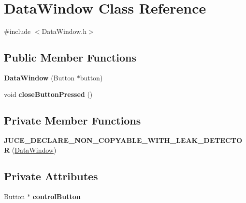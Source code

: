 \hypertarget{classDataWindow}{\section{Data\-Window Class Reference}
\label{classDataWindow}
}


{\ttfamily \#include $<$Data\-Window.\-h$>$}

\subsection*{Public Member Functions}
\begin{DoxyCompactItemize}
\item 
\hypertarget{classDataWindow_a2c1a0313c6a13ebf16c40db1a5832cca}{{\bfseries Data\-Window} (Button $\ast$button)}\label{classDataWindow_a2c1a0313c6a13ebf16c40db1a5832cca}

\item 
\hypertarget{classDataWindow_ad3e0318d8e542aa12b30791441cae5ab}{void {\bfseries close\-Button\-Pressed} ()}\label{classDataWindow_ad3e0318d8e542aa12b30791441cae5ab}

\end{DoxyCompactItemize}
\subsection*{Private Member Functions}
\begin{DoxyCompactItemize}
\item 
\hypertarget{classDataWindow_a4e4c8bb6b88c32202f4ee263aef5cbf5}{{\bfseries J\-U\-C\-E\-\_\-\-D\-E\-C\-L\-A\-R\-E\-\_\-\-N\-O\-N\-\_\-\-C\-O\-P\-Y\-A\-B\-L\-E\-\_\-\-W\-I\-T\-H\-\_\-\-L\-E\-A\-K\-\_\-\-D\-E\-T\-E\-C\-T\-O\-R} (\hyperlink{classDataWindow}{Data\-Window})}\label{classDataWindow_a4e4c8bb6b88c32202f4ee263aef5cbf5}

\end{DoxyCompactItemize}
\subsection*{Private Attributes}
\begin{DoxyCompactItemize}
\item 
\hypertarget{classDataWindow_a561ef07ade52eb60a50a13c1c6fc1622}{Button $\ast$ {\bfseries control\-Button}}\label{classDataWindow_a561ef07ade52eb60a50a13c1c6fc1622}

\end{DoxyCompactItemize}


